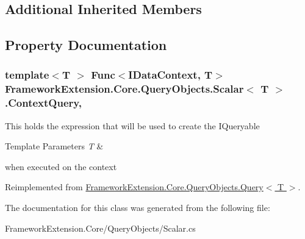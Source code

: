 \subsection*{Additional Inherited Members}


\subsection{Property Documentation}
\hypertarget{class_framework_extension_1_1_core_1_1_query_objects_1_1_scalar-g_ad6de4637a09a695d7934b52f5008369b}{
\subsubsection[{Context\-Query}]{\setlength{\rightskip}{0pt plus 5cm}template$<$T $>$ Func$<${\bf I\-Data\-Context}, T$>$ {\bf Framework\-Extension.\-Core.\-Query\-Objects.\-Scalar}$<$ T $>$.Context\-Query\hspace{0.3cm}{\ttfamily [get]}, {\ttfamily [set]}}}\label{class_framework_extension_1_1_core_1_1_query_objects_1_1_scalar-g_ad6de4637a09a695d7934b52f5008369b}


This holds the expression that will be used to create the I\-Queryable
\begin{DoxyTemplParams}{Template Parameters}
{\em T} & \\
\hline
\end{DoxyTemplParams}
when executed on the context 



Reimplemented from \hyperlink{class_framework_extension_1_1_core_1_1_query_objects_1_1_query-g_afc262d00f1a554c09fe74d2079d5e4c7}{Framework\-Extension.\-Core.\-Query\-Objects.\-Query$<$ T $>$}.



The documentation for this class was generated from the following file\-:\begin{DoxyCompactItemize}
\item 
Framework\-Extension.\-Core/\-Query\-Objects/Scalar.\-cs\end{DoxyCompactItemize}
